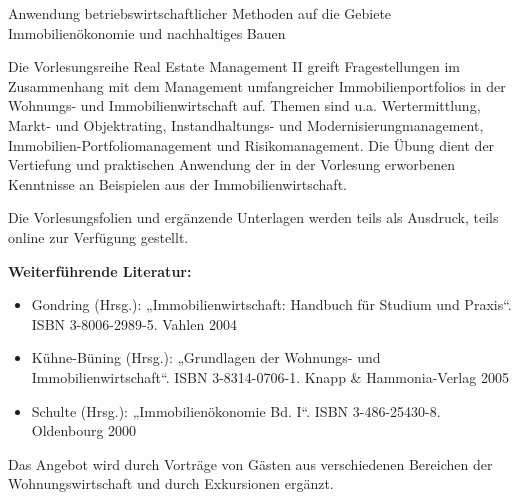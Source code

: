\begin{course}
\begin{learningoutcomes}
Anwendung betriebswirtschaftlicher Methoden auf die Gebiete Immobilienökonomie und nachhaltiges Bauen


\end{learningoutcomes}

\begin{content}
Die Vorlesungsreihe Real Estate Management II greift Fragestellungen im Zusammenhang mit dem Management umfangreicher Immobilienportfolios in der Wohnungs- und Immobilienwirtschaft auf. Themen sind u.a. Wertermittlung, Markt- und Objektrating, Instandhaltungs- und Modernisierungmanagement, Immobilien-Portfoliomanagement und Risikomanagement.\newline
Die Übung dient der Vertiefung und praktischen Anwendung der in der Vorlesung erworbenen Kenntnisse an Beispielen aus der Immobilienwirtschaft.


\end{content}

\begin{media}Die Vorlesungsfolien und ergänzende Unterlagen werden teils als Ausdruck, teils online zur Verfügung gestellt.

\end{media}

\begin{literature}\textbf{Weiterführende Literatur:}

 \begin{itemize}\item Gondring (Hrsg.): „Immobilienwirtschaft: Handbuch für Studium und Praxis“. ISBN 3-8006-2989-5. Vahlen 2004  \item Kühne-Büning (Hrsg.): „Grundlagen der Wohnungs- und Immobilienwirtschaft“. ISBN 3-8314-0706-1. Knapp \& Hammonia-Verlag 2005  \item Schulte (Hrsg.): „Immobilienökonomie Bd. I“. ISBN 3-486-25430-8. Oldenbourg 2000  \end{itemize}\end{literature}

\begin{remarks}Das Angebot wird durch Vorträge von Gästen aus verschiedenen Bereichen der Wohnungswirtschaft und durch Exkursionen ergänzt.

\end{remarks}

\end{course}